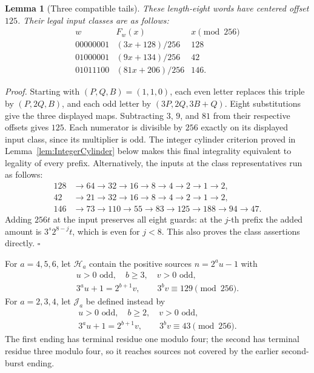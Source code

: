 \documentclass[11pt,letterpaper]{article}
\newtheorem{lemma}[theorem]{Lemma}
\newenvironment{proof}{\noindent\textit{Proof.}}{\hfill\(\square\)}
\begin{document}
\begin{lemma}[Three compatible tails]
These length-eight words have centered offset \(125\).
Their legal input classes are as follows:
\[
\begin{array}{c|c|c}
w&F_w(x)&x\pmod{256}\\
\hline
00000001&(3x+128)/256&128\\
01000001&(9x+134)/256&42\\
01011100&(81x+206)/256&146.
\end{array}
\]
\end{lemma}
\begin{proof}
Starting with \((P,Q,B)=(1,1,0)\), each even letter replaces this
triple by \((P,2Q,B)\), and each odd letter by
\((3P,2Q,3B+Q)\). Eight substitutions give the three displayed maps.
Subtracting \(3\), \(9\), and \(81\) from their respective offsets
gives \(125\). Each numerator is divisible by \(256\) exactly on
its displayed input class, since its multiplier is odd.
The integer cylinder criterion proved in Lemma~\ref{lem:IntegerCylinder}
below makes this final integrality equivalent to legality of every prefix.
Alternatively, the inputs at the class representatives run as follows:
\[
\begin{aligned}
128&\to64\to32\to16\to8\to4\to2\to1\to2,\\
42&\to21\to32\to16\to8\to4\to2\to1\to2,\\
146&\to73\to110\to55\to83\to125\to188\to94\to47.
\end{aligned}
\]
Adding \(256t\) at the input preserves all eight guards: at the
\(j\)-th prefix the added amount is \(3^s2^{8-j}t\), which is even
for \(j<8\). This also proves the class assertions directly.
\end{proof}

For \(a=4,5,6\), let \(\mathcal H_a\) contain the positive sources
\(n=2^a u-1\) with
\[
\begin{gathered}
u>0\text{ odd},\quad b\ge3,\quad v>0\text{ odd},\\
3^a u+1=2^{b+1}v,\qquad 3^b v\equiv129\pmod{256}.
\end{gathered}
\]
For \(a=2,3,4\), let \(\mathcal J_a\) be defined instead by
\[
\begin{gathered}
u>0\text{ odd},\quad b\ge2,\quad v>0\text{ odd},\\
3^a u+1=2^{b+1}v,\qquad 3^b v\equiv43\pmod{256}.
\end{gathered}
\]
The first ending has terminal residue one modulo four; the second has
terminal residue three modulo four, so it reaches sources not covered
by the earlier second-burst ending.
\end{document}
